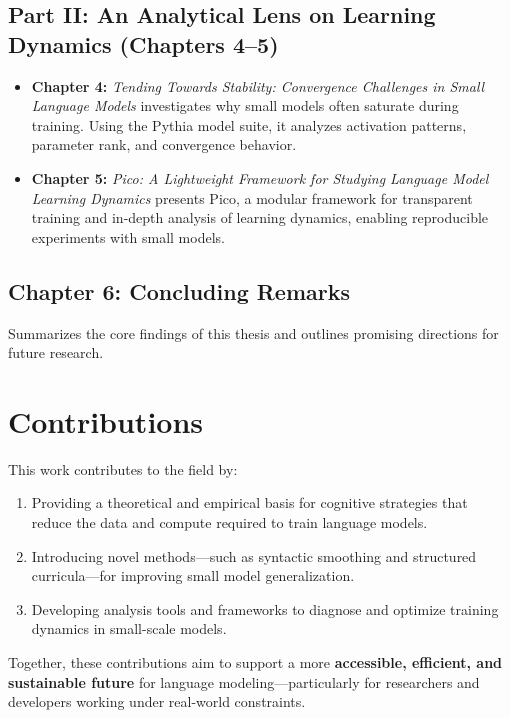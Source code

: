 \subsection*{Part II: An Analytical Lens on Learning Dynamics (Chapters 4–5)}

\begin{itemize}
    \item \textbf{Chapter 4:} \emph{Tending Towards Stability: Convergence Challenges in Small Language Models}  
    investigates why small models often saturate during training. Using the Pythia model suite, it analyzes activation patterns, parameter rank, and convergence behavior.

    \item \textbf{Chapter 5:} \emph{Pico: A Lightweight Framework for Studying Language Model Learning Dynamics}  
    presents Pico, a modular framework for transparent training and in-depth analysis of learning dynamics, enabling reproducible experiments with small models.
\end{itemize}

\subsection*{Chapter 6: Concluding Remarks}

Summarizes the core findings of this thesis and outlines promising directions for future research.

\section*{Contributions}

This work contributes to the field by:

\begin{enumerate}
    \item Providing a theoretical and empirical basis for cognitive strategies that reduce the data and compute required to train language models.
    \item Introducing novel methods—such as syntactic smoothing and structured curricula—for improving small model generalization.
    \item Developing analysis tools and frameworks to diagnose and optimize training dynamics in small-scale models.
\end{enumerate}

Together, these contributions aim to support a more \textbf{accessible, efficient, and sustainable future} for language modeling—particularly for researchers and developers working under real-world constraints.
